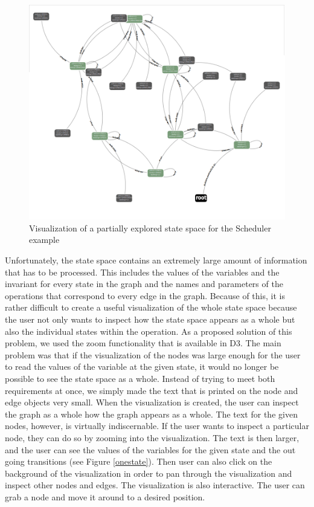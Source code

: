 \begin{center}
\begin{figure}[h!]
\centering
\includegraphics[width=13cm]{bilder/ss.png}
\caption{Visualization of a partially explored state space for the Scheduler example}
\label{zoomedOut}
\end{figure}
\end{center}

Unfortunately, the state space contains an extremely large amount of information that has to be processed. This includes the values of the variables and the invariant for every state in the graph and the names and parameters of the operations that correspond to every edge in the graph. Because of this, it is rather difficult to create a useful visualization of the whole state space because the user not only wants to inspect how the state space appears as a whole but also the individual states within the operation. As a proposed solution of this problem, we used the zoom functionality that is available in D3. The main problem was that if the visualization of the nodes was large enough for the user to read the values of the variable at the given state, it would no longer be possible to see the state space as a whole. Instead of trying to meet both requirements at once, we simply made the text that is printed on the node and edge objects very small. When the visualization is created, the user can inspect the graph as a whole how the graph appears as a whole. The text for the given nodes, however, is virtually indiscernable. If the user wants to inspect a particular node, they can do so by zooming into the visualization. The text is then larger, and the user can see the values of the variables for the given state and the out going transitions (see Figure \ref{onestate}). Then user can also click on the background of the visualization in order to pan through the visualization and inspect other nodes and edges. The visualization is also interactive. The user can grab a node and move it around to a desired position.

